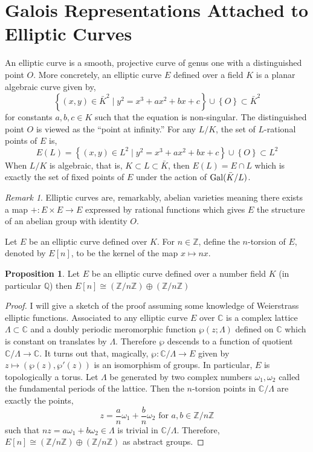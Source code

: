 \documentclass[12pt]{article}
\newcommand{\Z}{\mathbb{Z}}
\newcommand{\C}{\mathbb{C}}
\newcommand{\Q}{\mathbb{Q}}
\newcommand{\Gal}[1]{\mathrm{Gal} \small(#1 \small)}
\theoremstyle{remark}
\newtheorem*{remark}{Remark}
\theoremstyle{definition}
\newtheorem{proposition}[theorem]{Proposition}
\newenvironment{definition}[1][Definition:]{\begin{trivlist}
\item[\hskip \labelsep {\bfseries #1}]}{\end{trivlist}}
\begin{document}
\section{Galois Representations Attached to Elliptic Curves}


\begin{definition}
An elliptic curve is a smooth, projective curve of genus one with a distinguished point $O$. More concretely, an elliptic curve $E$ defined over a field $K$ is a planar algebraic curve given by,
\[ \left\{ (x,y) \in \bar{K}^2 \mid y^2 = x^3 + ax^2 + bx + c \right\} \cup \left\{ O \right\} \subset \bar{K}^2 \]
for constants $a,b,c \in K$ such that the equation is non-singular. The distinguished point $O$ is viewed as the ``point at infinity.'' For any $L / K$, the set of $L$-rational points of $E$ is,
\[ E(L) = \left\{ (x,y) \in L^2 \mid y^2 = x^3 + ax^2 + bx + c \right\} \cup \left\{ O \right\} \subset L^2 \]
When $L/K$ is algebraic, that is, $K \subset L \subset \bar{K}$, then $E(L) = E \cap L$ which is exactly the set of fixed points of $E$ under the action of $\Gal{\bar{K}/L}$. 
\end{definition}

\begin{remark}
Elliptic curves are, remarkably, abelian varieties meaning there exists a map $+ : E \times E \to E$ expressed by rational functions which gives $E$ the structure of an abelian group with identity $O$. 
\end{remark}

\begin{definition}
Let $E$ be an elliptic curve defined over $K$. For $n \in \Z$, define the $n$-torsion of $E$, denoted by $E[n]$, to be the kernel of the map $x \mapsto n x$. 
\end{definition}

\begin{proposition}
Let $E$ be an elliptic curve defined over a number field $K$ (in particular $\Q$) then $E[n] \cong (\Z / n \Z) \oplus (\Z / n \Z)$
\end{proposition}

\begin{proof}
I will give a sketch of the proof assuming some knowledge of Weierstrass elliptic functions. Associated to any elliptic curve $E$ over $\C$ is a complex lattice $\Lambda \subset \C$ and a doubly periodic meromorphic function $\wp(z ; \Lambda)$ defined on $\C$ which is constant on translates by $\Lambda$. Therefore $\wp$ descends to a function of quotient $\C / \Lambda \to \C$. It turns out that, magically, $\wp : \C / \Lambda \to E$ given by $z \mapsto (\wp(z), \wp'(z))$ is an isomorphism of groups. In particular, $E$ is topologically a torus. Let $\Lambda$ be generated by two complex numbers $\omega_1, \omega_2$ called the fundamental periods of the lattice. Then the $n$-torsion points in $\C / \Lambda$ are exactly the points,
\[ z = \frac{a}{n} \omega_1 + \frac{b}{n} \omega_2 \text{ for } a,b \in \Z / n \Z \]
such that $n z = a \omega_1 + b \omega_2 \in \Lambda$ is trivial in $\C / \Lambda$. Therefore, $E[n] \cong (\Z / n \Z) \oplus (\Z / n \Z)$ as abstract groups.     
\end{proof}
\end{document}
